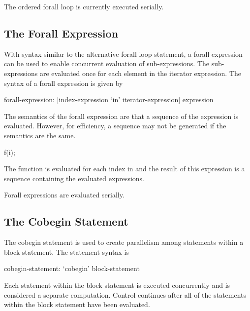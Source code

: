 \begin{implementation}
The ordered forall loop is currently executed serially.
\end{implementation}

\subsection{The Forall Expression}
\label{Forall_Expressions}

With syntax similar to the alternative forall loop statement, a forall
expression can be used to enable concurrent evaluation of
sub-expressions.  The sub-expressions are evaluated once for each
element in the iterator expression.  The syntax of a forall expression
is given by
\begin{syntax}
forall-expression:
   [index-expression `in' iterator-expression] expression
\end{syntax}

The semantics of the forall expression are that a sequence of the
expression is evaluated.  However, for efficiency, a sequence may not
be generated if the semantics are the same.

\begin{example}
\begin{chapel}
[i in S] f(i);
\end{chapel}
The function  is evaluated for each index in  and the
result of this expression is a sequence containing the evaluated
expressions.
\end{example}

\begin{implementation}
Forall expressions are evaluated serially.
\end{implementation}

\subsection{The Cobegin Statement}
\label{Cobegin}

The cobegin statement is used to create parallelism among statements
within a block statement. The  statement syntax is
\begin{syntax}
cobegin-statement:
  `cobegin' block-statement
\end{syntax}
Each statement within the block statement is executed concurrently and
is considered a separate computation.  Control continues after all of
the statements within the block statement have been evaluated.

